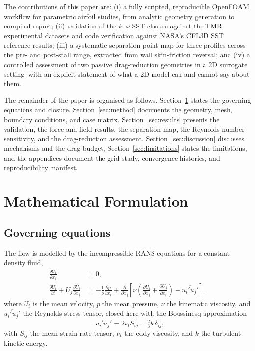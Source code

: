 \documentclass[11pt,a4paper]{article}
\begin{document}
The contributions of this paper are: (i) a fully scripted, reproducible OpenFOAM workflow for parametric airfoil studies, from analytic geometry generation to compiled report; (ii) validation of the $k$--$\omega$ SST closure against the TMR experimental datasets and code verification against NASA's CFL3D SST reference results; (iii) a systematic separation-point map for three profiles across the pre- and post-stall range, extracted from wall skin-friction reversal; and (iv) a controlled assessment of two passive drag-reduction geometries in a 2D surrogate setting, with an explicit statement of what a 2D model can and cannot say about them.

The remainder of the paper is organised as follows. Section~\ref{sec:formulation} states the governing equations and closure. Section~\ref{sec:method} documents the geometry, mesh, boundary conditions, and case matrix. Section~\ref{sec:results} presents the validation, the force and field results, the separation map, the Reynolds-number sensitivity, and the drag-reduction assessment. Section~\ref{sec:discussion} discusses mechanisms and the drag budget, Section~\ref{sec:limitations} states the limitations, and the appendices document the grid study, convergence histories, and reproducibility manifest.

\section{Mathematical Formulation}\label{sec:formulation}

\subsection{Governing equations}
The flow is modelled by the incompressible RANS equations for a constant-density fluid,
\begin{align}
  \frac{\partial U_i}{\partial x_i} &= 0, \label{eq:cont}\\
  \frac{\partial U_i}{\partial t} + U_j\frac{\partial U_i}{\partial x_j}
    &= -\frac{1}{\rho}\frac{\partial p}{\partial x_i}
       + \frac{\partial}{\partial x_j}\left[\nu\left(\frac{\partial U_i}{\partial x_j}+\frac{\partial U_j}{\partial x_i}\right) - \overline{u_i' u_j'}\right], \label{eq:mom}
\end{align}
where $U_i$ is the mean velocity, $p$ the mean pressure, $\nu$ the kinematic viscosity, and $\overline{u_i'u_j'}$ the Reynolds-stress tensor, closed here with the Boussinesq approximation
\begin{equation}
  -\overline{u_i'u_j'} = 2\nu_t S_{ij} - \tfrac{2}{3}k\,\delta_{ij},
\end{equation}
with $S_{ij}$ the mean strain-rate tensor, $\nu_t$ the eddy viscosity, and $k$ the turbulent kinetic energy.
\end{document}
